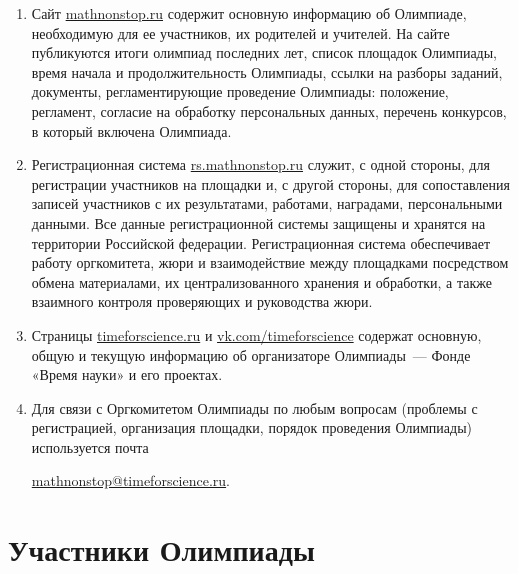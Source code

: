 \documentclass[a4paper,12pt]{article}
\newcommand{\surl}[1]{{\small\url{#1}}}
\begin{document}
\begin{enumerate}
	\item Сайт \surl{mathnonstop.ru} содержит основную информацию об Олимпиаде, необходимую для ее участников, их родителей и учителей. На сайте публикуются итоги олимпиад последних лет, список площадок Олимпиады, время начала и продолжительность Олимпиады, ссылки на разборы заданий, документы, регламентирующие проведение Олимпиады: положение, регламент, согласие на обработку персональных данных, перечень конкурсов, в который включена Олимпиада.
	\item Регистрационная система \surl{rs.mathnonstop.ru} служит, с одной стороны, для регистрации участников на площадки и, с другой стороны, для сопоставления записей участников с их результатами, работами, наградами, персональными данными. Все данные регистрационной системы защищены и хранятся на территории Российской федерации. Регистрационная система обеспечивает работу оргкомитета, жюри и взаимодействие между площадками посредством обмена материалами, их централизованного хранения и обработки, а также взаимного контроля проверяющих и руководства жюри.
	\item Страницы \surl{timeforscience.ru} и \surl{vk.com/timeforscience} содержат основную, общую и текущую информацию об организаторе Олимпиады~— Фонде «Время науки» и его проектах.
	\item Для связи с Оргкомитетом Олимпиады по любым вопросам (проблемы с регистрацией, организация площадки, порядок проведения Олимпиады) используется почта
	\begin{center} \surl{mathnonstop@timeforscience.ru}. \end{center}
\end{enumerate}

\section{Участники Олимпиады}
\end{document}
